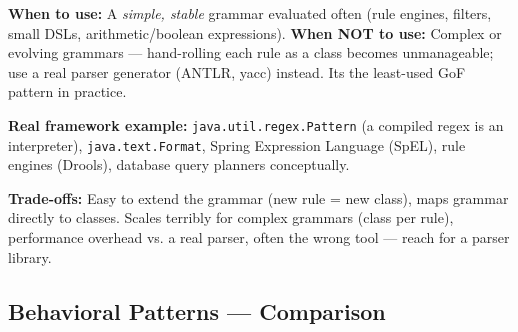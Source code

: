 \documentclass[11pt]{article}
\begin{document}
\textbf{When to use:} A \emph{simple, stable} grammar evaluated often (rule engines, filters, small DSLs, arithmetic/boolean expressions). \textbf{When NOT to use:} Complex or evolving grammars --- hand-rolling each rule as a class becomes unmanageable; use a real parser generator (ANTLR, yacc) instead. It\textquotesingle s the least-used GoF pattern in practice.

\textbf{Real framework example:} \texttt{java.util.regex.Pattern} (a compiled regex is an interpreter), \texttt{java.text.Format}, Spring Expression Language (SpEL), rule engines (Drools), database query planners conceptually.

\textbf{Trade-offs:} Easy to extend the grammar (new rule = new class), maps grammar directly to classes. Scales terribly for complex grammars (class per rule), performance overhead vs. a real parser, often the wrong tool --- reach for a parser library.

\subsection{Behavioral Patterns --- Comparison}\label{behavioral-patterns--comparison}
\end{document}
